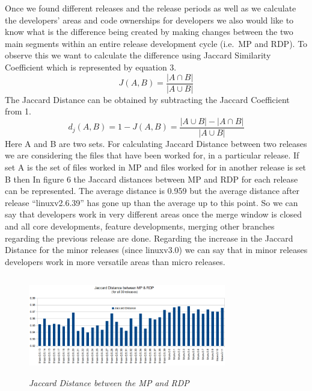 \documentclass{acm_proc_article-sp}
\begin{document}
Once we found different releases and the release periods as well as we calculate the developers' areas and code ownerships for developers we also would like to know what is the difference being created by making changes between the two main segments within an entire release development cycle (i.e.\ MP and RDP). To observe this we want to calculate the difference using Jaccard Similarity Coefficient \cite{jaccard_alpine} which is represented by equation 3.
\begin{equation} J(A, B) =\frac{|A \cap B|}{|A \cup B|} \end{equation}
The Jaccard Distance can be obtained by subtracting the Jaccard Coefficient from 1.
\begin{equation} d_j(A, B) = 1 - J(A, B) = \frac{|A \cup B|-|A \cap B|}{|A \cup B|} \end{equation}
Here A and B are two sets. For calculating Jaccard Distance between two releases we are considering the files that have been worked for, in a particular release. If set A is the set of files worked in MP and files worked for in another release is set B then In figure 6 the Jaccard distances between MP and RDP for each release can be represented. The average distance is 0.959 but the average distance after release ``linuxv2.6.39'' has gone up than the average up to this point. So we can say that developers work in very different areas once the merge window is closed and all core developments, feature developments, merging other branches regarding the previous release are done. Regarding the increase in the Jaccard Distance for the minor releases (since linuxv3.0) we can say that in minor releases developers work in more versatile areas than micro releases.

\begin{figure}
\begin{center}
\includegraphics[height=1.7in,width=3.4in]{jaccardmprdp.png}
\caption{\small \sl Jaccard Distance between the MP and RDP}
\end{center}
\end{figure}
\end{document}
